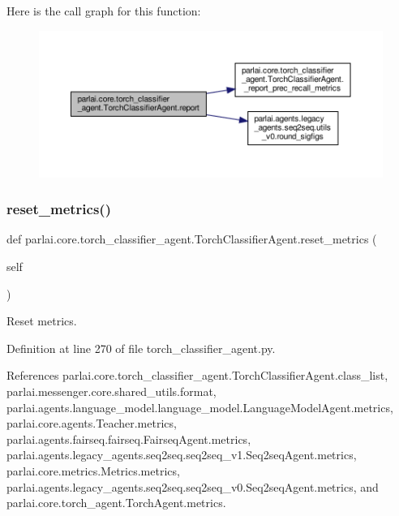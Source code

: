Here is the call graph for this function\+:
\nopagebreak
\begin{figure}[H]
\begin{center}
\leavevmode
\includegraphics[width=350pt]{classparlai_1_1core_1_1torch__classifier__agent_1_1TorchClassifierAgent_acf3aabdf7a98e434614c4da20c599df2_cgraph}
\end{center}
\end{figure}
\mbox{\label{classparlai_1_1core_1_1torch__classifier__agent_1_1TorchClassifierAgent_ac96e55ac13019eace0641a7efcf6dc44}} 
\subsubsection{\texorpdfstring{reset\+\_\+metrics()}{reset\_metrics()}}
{\footnotesize\ttfamily def parlai.\+core.\+torch\+\_\+classifier\+\_\+agent.\+Torch\+Classifier\+Agent.\+reset\+\_\+metrics (\begin{DoxyParamCaption}\item[{}]{self }\end{DoxyParamCaption})}

\begin{DoxyVerb}Reset metrics.\end{DoxyVerb}
 

Definition at line 270 of file torch\+\_\+classifier\+\_\+agent.\+py.



References parlai.\+core.\+torch\+\_\+classifier\+\_\+agent.\+Torch\+Classifier\+Agent.\+class\+\_\+list, parlai.\+messenger.\+core.\+shared\+\_\+utils.\+format, parlai.\+agents.\+language\+\_\+model.\+language\+\_\+model.\+Language\+Model\+Agent.\+metrics, parlai.\+core.\+agents.\+Teacher.\+metrics, parlai.\+agents.\+fairseq.\+fairseq.\+Fairseq\+Agent.\+metrics, parlai.\+agents.\+legacy\+\_\+agents.\+seq2seq.\+seq2seq\+\_\+v1.\+Seq2seq\+Agent.\+metrics, parlai.\+core.\+metrics.\+Metrics.\+metrics, parlai.\+agents.\+legacy\+\_\+agents.\+seq2seq.\+seq2seq\+\_\+v0.\+Seq2seq\+Agent.\+metrics, and parlai.\+core.\+torch\+\_\+agent.\+Torch\+Agent.\+metrics.

